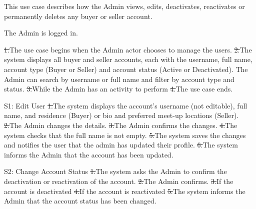 This use case describes how the Admin views, edits, deactivates, reactivates or permanently deletes any buyer or seller account.\par
{}
The Admin is logged in.\par
{}
\st{1.}{The use case begins when the Admin actor chooses to manage the users.}
\st{2.}{The system displays all buyer and seller accounts, each with the username, full name, account type (Buyer or Seller) and account status (Active or Deactivated). The Admin can search by username or full name and filter by account type and status.}
\st{3.}{While the Admin has an activity to perform}
\st{4.}{The use case ends.}
\begin{flowblock}{S1: Edit User}
\st{1.}{The system displays the account's username (not editable), full name, and residence (Buyer) or bio and preferred meet-up locations (Seller).}
\st{2.}{The Admin changes the details.}
\st{3.}{The Admin confirms the changes.}
\st{4.}{The system checks that the full name is not empty.}
\st{5.}{The system saves the changes and notifies the user that the admin has updated their profile.}
\st{6.}{The system informs the Admin that the account has been updated.}
\end{flowblock}
\begin{flowblock}{S2: Change Account Status}
\st{1.}{The system asks the Admin to confirm the deactivation or reactivation of the account.}
\st{2.}{The Admin confirms.}
\st{3.}{If the account is deactivated}
\st{4.}{If the account is reactivated}
\st{5.}{The system informs the Admin that the account status has been changed.}
\end{flowblock}
